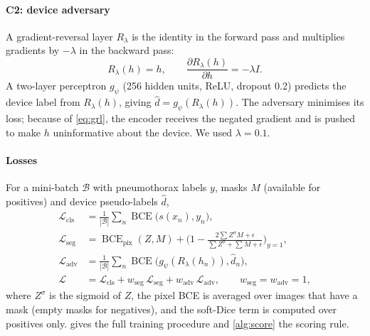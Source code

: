 \documentclass[final,3p]{elsarticle}
\DeclareMathOperator{\BCE}{BCE}
\begin{document}
\paragraph{C2: device adversary}
A gradient-reversal layer $R_\lambda$ \citep{ganin2015dann} is the identity in the forward pass and multiplies gradients by $-\lambda$ in the backward pass:
\begin{equation}
R_\lambda(h)=h,\qquad \frac{\partial R_\lambda(h)}{\partial h}=-\lambda I.
\label{eq:grl}
\end{equation}
A two-layer perceptron $g_\psi$ (256 hidden units, ReLU, dropout 0.2) predicts the device label from $R_\lambda(h)$, giving $\hat d = g_\psi(R_\lambda(h))$. The adversary minimises its loss; because of \cref{eq:grl}, the encoder receives the negated gradient and is pushed to make $h$ uninformative about the device. We used $\lambda=0.1$.

\paragraph{Losses}
For a mini-batch $\mathcal{B}$ with pneumothorax labels $y$, masks $M$ (available for positives) and device pseudo-labels $\hat d$,
\begin{align}
\mathcal{L}_{\text{cls}} &= \tfrac{1}{|\mathcal{B}|}\textstyle\sum_{n}\BCE\big(s(x_n),y_n\big), \label{eq:lcls}\\
\mathcal{L}_{\text{seg}} &= \BCE_{\text{pix}}(Z,M) + \Big(1-\frac{2\sum Z^\sigma M + \epsilon}{\sum Z^\sigma + \sum M + \epsilon}\Big)_{y=1}, \label{eq:lseg}\\
\mathcal{L}_{\text{adv}} &= \tfrac{1}{|\mathcal{B}|}\textstyle\sum_n\BCE\big(g_\psi(R_\lambda(h_n)),\hat d_n\big), \label{eq:ladv}\\
\mathcal{L} &= \mathcal{L}_{\text{cls}} + w_{\text{seg}}\,\mathcal{L}_{\text{seg}} + w_{\text{adv}}\,\mathcal{L}_{\text{adv}},\qquad w_{\text{seg}}=w_{\text{adv}}=1, \label{eq:ltotal}
\end{align}
where $Z^\sigma$ is the sigmoid of $Z$, the pixel BCE is averaged over images that have a mask (empty masks for negatives), and the soft-Dice term is computed over positives only.  gives the full training procedure and \cref{alg:score} the scoring rule.
\end{document}
